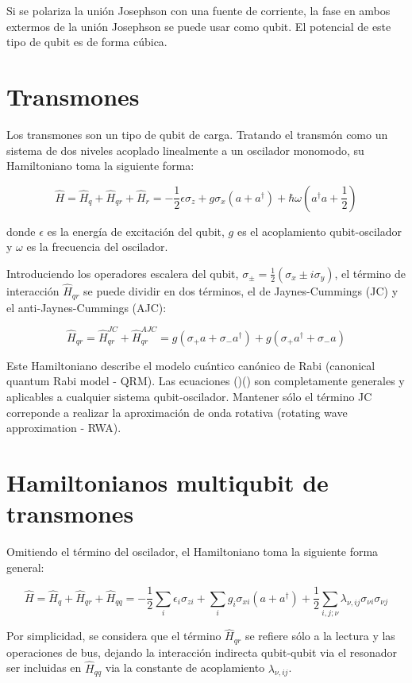 Si se polariza la unión Josephson con una fuente de corriente, la fase en ambos extermos de la unión Josephson se puede usar como qubit. El potencial de este tipo de qubit es de forma cúbica.

\section{Transmones}

Los transmones son un tipo de qubit de carga. Tratando el transmón como un sistema de dos niveles acoplado linealmente a un oscilador monomodo, su Hamiltoniano toma la siguiente forma:

\[
\hat{H} = \hat{H}_q + \hat{H}_{qr} + \hat{H}_r = -\frac{1}{2} \epsilon \sigma_z + g \sigma_x (a+a^\dag) + \hbar \omega (a^\dag a + \frac{1}{2})
\]

donde $\epsilon$ es la energía de excitación del qubit, $g$ es el acoplamiento qubit-oscilador y $\omega$ es la frecuencia del oscilador.
\vspace{0.5cm}

Introduciendo los operadores escalera del qubit, $\sigma_\pm = \frac{1}{2}(\sigma_x \pm i \sigma_y)$, el término de interacción $\hat{H}_{qr}$ se puede dividir en dos términos, el de Jaynes-Cummings (JC) y el anti-Jaynes-Cummings (AJC):

\[
\hat{H}_{qr} = \hat{H}_{qr}^{JC} + \hat{H}_{qr}^{AJC} = g(\sigma_+ a + \sigma_- a^\dag) + g(\sigma_+ a^\dag + \sigma_- a)
\]

Este Hamiltoniano describe el modelo cuántico canónico de Rabi (canonical quantum Rabi model - QRM). Las ecuaciones ()() son completamente generales y aplicables a cualquier sistema qubit-oscilador. Mantener sólo el término JC correponde a realizar la aproximación de onda rotativa (rotating wave approximation - RWA).

\section{Hamiltonianos multiqubit de transmones}
Omitiendo el término del oscilador, el Hamiltoniano toma la siguiente forma general:

\[
\hat{H} = \hat{H}_q + \hat{H}_{qr} + \hat{H}_{qq} = -\frac{1}{2} \sum\limits_i \epsilon_i \sigma_{zi} + \sum\limits_i g_i \sigma_{xi} (a+a^\dag) + \frac{1}{2} \sum\limits_{i,j;\nu} \lambda_{\nu,ij} \sigma_{\nu i} \sigma_{\nu j}
\]

Por simplicidad, se considera que el término $\hat{H}_{qr}$ se refiere sólo a la lectura y las operaciones de bus, dejando la interacción indirecta qubit-qubit via el resonador ser incluidas en $\hat{H}_{qq}$ via la constante de acoplamiento $\lambda_{\nu,ij}$.

